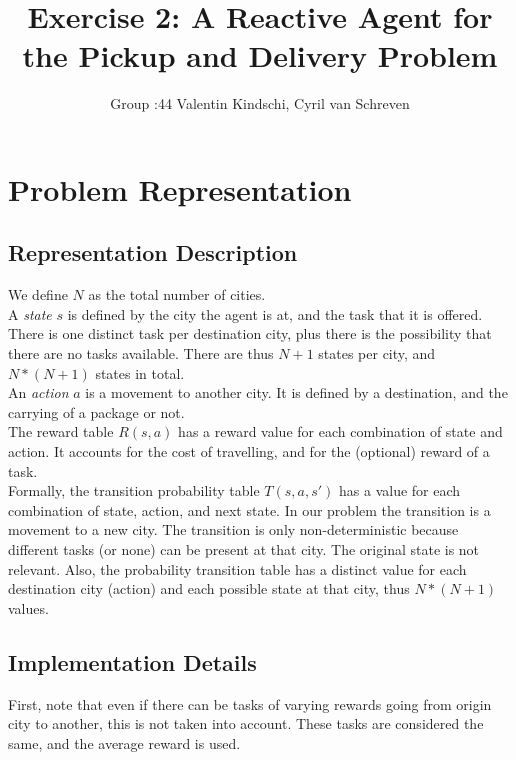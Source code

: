 \documentclass[11pt]{article}
\title{\bf Exercise 2: A Reactive Agent for the Pickup and Delivery Problem}
\author{Group \textnumero:44 Valentin Kindschi, Cyril van Schreven}
\begin{document}
\maketitle

\section{Problem Representation}

\subsection{Representation Description}

We define $N$ as the total number of cities.\\

A \textit{state} $s$ is defined by the city the agent is at, and the task that it is offered. There is one distinct task per destination city, plus there is the possibility that there are no tasks available. There are thus $N+1$ states per city, and $N*(N+1)$ states in total.\\

An \textit{action} $a$ is a movement to another city. It is defined by a destination, and the carrying of a package or not.\\

The reward table $R(s,a)$ has a reward value for each combination of state and action. It accounts for the cost of travelling, and for the (optional) reward of a task.\\

Formally, the transition probability table $T(s,a,s')$ has a value for each combination of state, action, and next state. In our problem the transition is a movement to a new city. The transition is only non-deterministic because different tasks (or none) can be present at that city. The original state is not relevant. Also, the probability transition table has a distinct value for each destination city (action) and each possible state at that city, thus $N*(N+1)$ values.

\subsection{Implementation Details}
First, note that even if there can be tasks of varying rewards going from origin city to another, this is not taken into account. These tasks are considered the same, and the average reward is used.\\
\end{document}
